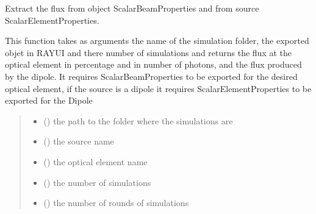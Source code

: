 \documentclass[letterpaper,10pt,english]{sphinxmanual}
\begin{document}
\begin{fulllineitems}
\begin{fulllineitems}
\label{\detokenize{API:raypyng.postprocessing.PostProcessAnalyzed.retrieve_flux_beamline}}
\pysigstartsignatures
{}
\pysigstopsignatures
\sphinxAtStartPar
Extract the flux from object ScalarBeamProperties and from source ScalarElementProperties.

\sphinxAtStartPar
This function takes as arguments the name of the
simulation folder, the exported objet in RAY\sphinxhyphen{}UI and there
number of simulations and returns the flux at the optical element in
percentage and in number of photons, and the flux produced
by the dipole.
It requires ScalarBeamProperties to be exported for the desired optical element,
if the source is a dipole it requires ScalarElementProperties to be exported for the Dipole
\begin{quote}\begin{description}
\begin{itemize}
\item {} 
\sphinxAtStartPar
{} () \textendash{} the path to the folder where the simulations are

\item {} 
\sphinxAtStartPar
{} () \textendash{} the source name

\item {} 
\sphinxAtStartPar
{} () \textendash{} the optical element name

\item {} 
\sphinxAtStartPar
{} () \textendash{} the number of simulations

\item {} 
\sphinxAtStartPar
{} () \textendash{} the number of rounds of simulations


\end{itemize}
\end{description}
\end{quote}
\end{fulllineitems}
\end{fulllineitems}
\end{document}
